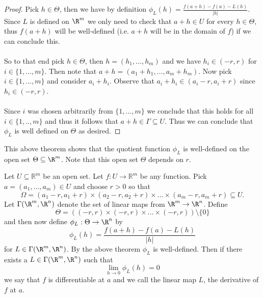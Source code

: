		\begin{proof}
			Pick $h \in \Theta$, then we have by definition $\phi_L(h) = \frac{f(a+h) - f(a) - L(h)}{|h|}$. Since $L$ is defined on $\R^m$ we only need to check that $a + h \in U$ for every $h \in \Theta$, thus $f(a+h)$ will be well-defined (i.e. $a+h$ will be in the domain of $f$) if we can conclude this.
			\\ \\
			So to that end pick $h \in \Theta$, then $h = (h_1, \dots, h_m)$ and we have  $h_i \in (-r, r)$ for $i \in \{1, \dots, m\}$. Then note that $a+h = (a_1 + h_1, \dots, a_m + h_m)$. Now pick $i \in \{1, \dots, m\}$ and consider $a_i + h_i$. Observe that $a_i + h_i \in (a_i -r, a_i + r)$ since $h_i \in (-r, r)$. \\ \\ Since $i$ was chosen arbitrarily from $\{1, ..., m\}$ we conclude that this holds for all $i \in \{1, .., m\}$ and thus it follows that $a+h \in \Gamma \subseteq U$. Thus we can conclude that $\phi_L$ is well defined on $\Theta$ as desired.
		\end{proof}
		
		
		\begin{remark}
			This above theorem shows that the quotient function $\phi_L$ is well-defined on the open set $\Theta \subseteq \R^m$. Note that this open set $\Theta$ depends on $r$.
		\end{remark}
		
			\begin{definition}
				Let $U \subseteq \mathbb{R}^m$ be an open set. Let $f : U \to \mathbb{R}^m$ be any function. Pick $a = (a_1, \dots, a_m) \in U$ and choose $r > 0$ so that $$\Omega = \left(a_1 - r, a_1 + r \right) \times \left(a_2 - r, a_2 + r \right) \times \dots \times \left(a_m - r, a_m + r \right)   \subseteq U.$$ Let $\Gamma(\R^m, \R^n)$ denote the set of linear maps from $\R^m \to \R^n$. Define $$\Theta = \left((-r, r) \times (-r, r) \times \dots \times (-r, r) \right) \setminus \{0\}$$  and then now define $\phi_L : \Theta \to \R^n$ by $$\phi_L(h) = \frac{f(a+h) - f(a) - L(h)}{|h|}$$ for $L \in \Gamma(\R^m, \R^n)$. By the above theorem $\phi_L$ is well-defined. Then if there exists a $L \in \Gamma(\R^m, \R^n)$ such that $$\lim_{h \to 0} \phi_L(h) = 0$$ we say that $f$ is differentiable at $a$ and we call the linear map $L$, the derivative of $f$ at $a$.
			\end{definition}
		
